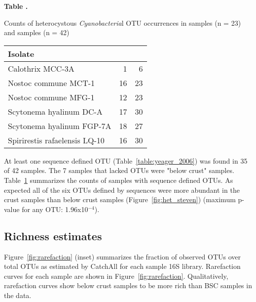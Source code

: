 \begin{table}

\textbf{
    \label{table:het_dist}
    Table .
}
    
    {Counts of heterocystous \textit{Cyanobacteria}l OTU occurrences in \citet{Garcia_Pichel_2013} samples (n = 23) and \citet{Steven_2013} samples (n = 42)}

{\centering
\begin{tabular}{lrr}
  \toprule
 Isolate & \citet{Garcia_Pichel_2013} & \citet{Steven_2013} \\ 
  \midrule
Calothrix MCC-3A &   1 &   6 \\ \midrule
Nostoc commune MCT-1 &  16 &  23 \\ \midrule
Nostoc commune MFG-1 &  12 &  23 \\ \midrule
Scytonema hyalinum DC-A &  17 &  30 \\ \midrule
Scytonema hyalinum FGP-7A &  18 &  27 \\ \midrule
Spirirestis rafaelensis LQ-10 &  16 &  30 \\
   \bottomrule
\end{tabular}}{}
\end{table}

At least one \citet{Yeager} sequence defined OTU
(Table~\ref{table:yeager_2006}) was found in 35 of 42 \citet{Steven_2013}
samples. The 7 samples that lacked \citet{Yeager} OTUs were "below crust"
samples.  Table~\ref{table:het_dist} summarizes the counts of
\citet{Steven_2013} samples with \citet{Yeager} sequence defined OTUs. As
expected all of the six OTUs defined by \citet{Yeager} sequences were more
abundant in the crust samples than below crust samples
(Figure~\ref{fig:het_steven}) (maximum p-value for any OTU: 1.96x10$^{-4}$).

\subsection{Richness estimates}
Figure~\ref{fig:rarefaction} (inset) summarizes the fraction of observed OTUs
over total OTUs as estimated by CatchAll for each sample 16S library.
Rarefaction curves for each sample are shown in Figure~\ref{fig:rarefaction}.
Qualitatively, rarefaction curves show below crust samples to be more rich than
BSC samples in the \citet{Steven_2013} data.

